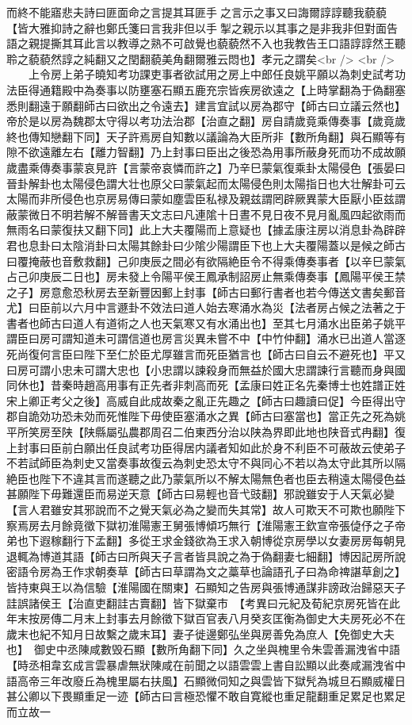 而終不能寤悲夫詩曰匪面命之言提其耳匪手之言示之事又曰誨爾諄諄聽我藐藐【皆大雅抑詩之辭也鄭氏箋曰言我非但以手掣之親示以其事之是非我非但對面告語之親提撕其耳此言以教導之熟不可啟覺也藐藐然不入也我教告王口語諄諄然王聽聆之藐藐然諄之純翻又之閏翻藐美角翻爾雅云悶也】孝元之謂矣<br />
<br />
　　上令房上弟子曉知考功課吏事者欲試用之房上中郎任良姚平願以為刺史試考功法臣得通籍殿中為奏事以防壅塞石顯五鹿充宗皆疾房欲遠之【上時掌翻為于偽翻塞悉則翻遠于願翻師古曰欲出之令遠去】建言宜試以房為郡守【師古曰立議云然也】帝於是以房為魏郡太守得以考功法治郡【治直之翻】房自請歲竟乘傳奏事【歲竟歲終也傳知戀翻下同】天子許焉房自知數以議論為大臣所非【數所角翻】與石顯等有隙不欲遠離左右【離力智翻】乃上封事曰臣出之後恐為用事所蔽身死而功不成故願歲盡乘傳奏事蒙哀見許【言蒙帝哀憐而許之】乃辛巳蒙氣復乘卦太陽侵色【張晏曰晉卦解卦也太陽侵色謂大壮也原父曰蒙氣起而太陽侵色則太陽指日也大壮解卦可云太陽而非所侵色也京房易傳曰蒙如塵雲臣私禄及親兹謂罔辟厥異蒙大臣厭小臣兹謂蔽蒙微日不明若解不解晉書天文志曰凡連隂十日晝不見日夜不見月亂風四起欲雨而無雨名曰蒙復扶又翻下同】此上大夫覆陽而上意疑也【據孟康注房以消息卦為辟辟君也息卦曰太陰消卦曰太陽其餘卦曰少隂少陽謂臣下也上大夫覆陽蓋以是候之師古曰覆掩蔽也音敷救翻】己卯庚辰之間必有欲隔絶臣令不得乘傳奏事者【以辛巳蒙氣占己卯庚辰二日也】房未發上令陽平侯王鳳承制詔房止無乘傳奏事【鳳陽平侯王禁之子】房意愈恐秋房去至新豐因郵上封事【師古曰郵行書者也若今傳送文書矣郵音尤】曰臣前以六月中言遯卦不效法曰道人始去寒涌水為災【法者房占候之法著之于書者也師古曰道人有道術之人也天氣寒又有水涌出也】至其七月涌水出臣弟子姚平謂臣曰房可謂知道未可謂信道也房言災異未嘗不中【中竹仲翻】涌水已出道人當逐死尚復何言臣曰陛下至仁於臣尤厚雖言而死臣猶言也【師古曰自云不避死也】平又曰房可謂小忠未可謂大忠也【小忠謂以諫殺身而無益於國大忠謂諫行言聽而身與國同休也】昔秦時趙高用事有正先者非刺高而死【孟康曰姓正名先秦博士也姓譜正姓宋上卿正考父之後】高威自此成故秦之亂正先趣之【師古曰趣讀曰促】今臣得出守郡自詭効功恐未効而死惟陛下毋使臣塞涌水之異【師古曰塞當也】當正先之死為姚平所笑房至陕【陕縣屬弘農郡周召二伯東西分治以陕為界即此地也陕音式冉翻】復上封事曰臣前白願出任良試考功臣得居内議者知如此於身不利臣不可蔽故云使弟子不若試師臣為刺史又當奏事故復云為刺史恐太守不與同心不若以為太守此其所以隔絶臣也陛下不違其言而遂聽之此乃蒙氣所以不解太陽無色者也臣去稍遠太陽侵色益甚願陛下毋難還臣而易逆天意【師古曰易輕也音弋豉翻】邪說雖安于人天氣必變【言人君雖安其邪說而不之覺天氣必為之變而失其常】故人可欺天不可欺也願陛下察焉房去月餘竟徵下獄初淮陽憲王舅張博傾巧無行【淮陽憲王欽宣帝張偼伃之子帝弟也下遐稼翻行下孟翻】多從王求金錢欲為王求入朝博從京房學以女妻房房每朝見退輒為博道其語【師古曰所與天子言者皆具說之為于偽翻妻七細翻】博因記房所說密語令房為王作求朝奏草【師古曰草謂為文之藁草也論語孔子曰為命禆諶草創之】皆持東與王以為信驗【淮陽國在關東】石顯知之告房與張博通謀非謗政治歸惡天子詿誤諸侯王【治直吏翻詿古賣翻】皆下獄棄市　【考異曰元紀及荀紀京房死皆在此年末按房傳二月末上封事去月餘徵下獄百官表八月癸亥匡衡為御史大夫房死必不在歲末也紀不知月日故繫之歲末耳】妻子徙邊鄭弘坐與房善免為庶人【免御史大夫也】　御史中丞陳咸數毁石顯【數所角翻下同】久之坐與槐里令朱雲善漏洩省中語【時丞相韋玄成言雲暴虐無狀陳咸在前聞之以語雲雲上書自訟顯以此奏咸漏洩省中語高帝三年改廢丘為槐里屬右扶風】石顯微伺知之與雲皆下獄髠為城旦石顯威權日甚公卿以下畏顯重足一迹【師古曰言極恐懼不敢自寛縱也重足龍翻重足累足也累足而立故一